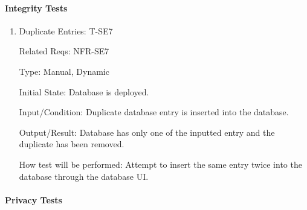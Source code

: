 \documentclass[12pt, titlepage]{article}
\begin{document}
\paragraph{Integrity Tests}

\begin{enumerate}

\item{Duplicate Entries: T-SE7\\}

Related Reqs: NFR-SE7

Type: Manual, Dynamic
					
Initial State: Database is deployed.
					
Input/Condition: Duplicate database entry is inserted into the database.
					
Output/Result: Database has only one of the inputted entry and the duplicate has been removed.
					
How test will be performed: Attempt to insert the same entry twice into the database through the database UI.

\end{enumerate}

\paragraph{Privacy Tests}
\end{document}
